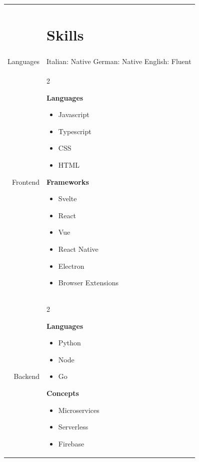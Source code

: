 \documentclass[letterpaper,11pt]{article}
\newcommand{\headingfont}{\Large\color{accent}\BluuNext}
\newenvironment{compactlist}{
  \begin{itemize}[noitemsep,nolistsep,partopsep=-20pt,topsep=-20pt,leftmargin=0pt, label=--]
      }{
  \end{itemize}
}
\newenvironment{lr}{
  \setlength\multicolsep{-1.7em}
  \begin{multicols}{2}
}{
  \end{multicols}
}
\newenvironment{SectionTable}[1]{
	\renewcommand*{\arraystretch}{1.7}
	\setlength{\tabcolsep}{10pt}
	\begin{longtable}{Rp{5.2in}} & #1 \\}
{\end{longtable}\vspace{-.3cm}}
\begin{document}
\begin{SectionTable}{\headingfont \section{Skills}}

  Languages &
  Italian: Native \newline
  German: Native \newline
  English: Fluent \newline
  \\

  Frontend &
  \begin{lr}
    \textbf{Languages}
    \begin{compactlist}
      \item Javascript
      \item Typescript
      \item CSS
      \item HTML
    \end{compactlist}

    \columnbreak

    \textbf{Frameworks}
    \begin{compactlist}
      \item Svelte
      \item React
      \item Vue
      \item React Native
      \item Electron
      \item Browser Extensions
    \end{compactlist}
  \end{lr}
  \\

  Backend &
  \begin{lr}
    \textbf{Languages}
    \begin{compactlist}
      \item Python
      \item Node
      \item Go
    \end{compactlist}
    \columnbreak
    \textbf{Concepts}
    \begin{compactlist}
      \item Microservices
      \item Serverless
      \item Firebase
    \end{compactlist}
  \end{lr}
  \\


\end{SectionTable}
\end{document}
